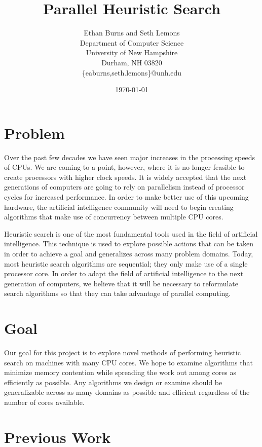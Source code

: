 \documentclass{article}
\title{\textbf{Parallel Heuristic Search}}
\author{Ethan Burns and Seth Lemons \\
  Department of Computer Science \\
  University of New Hampshire \\
  Durham, NH 03820 \\
  \{eaburns,seth.lemons\}@unh.edu}
\date{\today}
\begin{document}
\maketitle

\section{Problem}

Over the past few decades we have seen major increases in the
processing speeds of CPUs.  We are coming to a point, however, where
it is no longer feasible to create processors with higher clock
speeds.  It is widely accepted that the next generations of computers
are going to rely on parallelism instead of processor cycles for
increased performance.  In order to make better use of this upcoming
hardware, the artificial intelligence community will need to begin
creating algorithms that make use of concurrency between multiple CPU
cores.

Heuristic search is one of the most fundamental tools used in the
field of artificial intelligence.  This technique is used to explore
possible actions that can be taken in order to achieve a goal and generalizes across many problem domains.  Today, most
heuristic search algorithms are sequential; they only make use of a
single processor core.  In order to adapt the field of artificial
intelligence to the next generation of computers, we believe that it
will be necessary to reformulate search algorithms so that they can
take advantage of parallel computing.

\section{Goal}

Our goal for this project is to explore novel methods of performing
heuristic search on machines with many CPU cores. We hope to examine
algorithms that minimize memory contention while spreading the work
out among cores as efficiently as possible. Any algorithms we design
or examine should be generalizable across as many domains as possible
and efficient regardless of the number of cores available.

\section{Previous Work}
\end{document}
